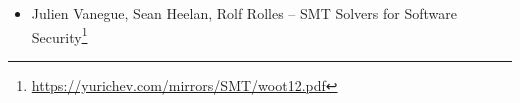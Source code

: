 \begin{itemize}

\item Julien Vanegue, Sean Heelan, Rolf Rolles -- SMT Solvers for Software Security\footnote{\url{https://yurichev.com/mirrors/SMT/woot12.pdf}}

\end{itemize}
